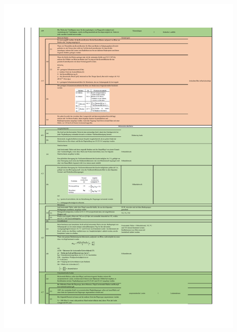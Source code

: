 \begin{table}[H]
\centering
\includegraphics[width=0.9\textwidth]{bilder/Tabellen/MPP_Konstruktion_5.pdf}
\end{table}


